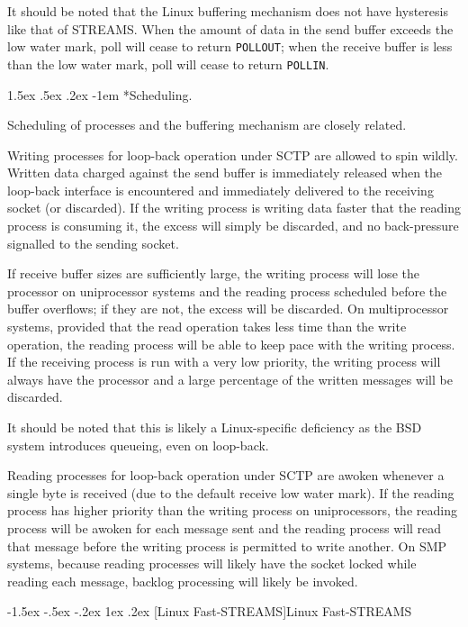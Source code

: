 \documentclass[letterpaper,final,notitlepage,twocolumn,10pt,twoside]{article}
\makeatletter
\renewcommand\subsection{\@startsection{subsection}{2}{\z@}%
                                     {-1.5ex \@plus -.5ex \@minus -.2ex}%
                                     {1ex \@plus .2ex}%
                                     {\normalfont\normalsize\bfseries}}
\renewcommand\paragraph{\@startsection{paragraph}{4}{\z@}%
                                    {1.5ex \@plus .5ex \@minus .2ex}%
                                    {-1em}%
                                    {\normalfont\normalsize\bfseries\slshape}}
\makeatother
\begin{document}
It should be noted that the Linux buffering mechanism does not have hysteresis
like that of STREAMS.  When the amount of data in the send buffer exceeds the
low water mark, poll will cease to return \texttt{POLLOUT}; when the receive
buffer is less than the low water mark, poll will cease to return
\texttt{POLLIN}.

\paragraph*{Scheduling.}

Scheduling of processes and the buffering mechanism are closely related.

Writing processes for loop-back operation under SCTP are allowed to spin
wildly.  Written data charged against the send buffer is immediately released
when the loop-back interface is encountered and immediately delivered to the
receiving socket (or discarded).  If the writing process is writing data
faster that the reading process is consuming it, the excess will simply be
discarded, and no back-pressure signalled to the sending socket.

If receive buffer sizes are sufficiently large, the writing process will lose
the processor on uniprocessor systems and the reading process scheduled before
the buffer overflows; if they are not, the excess will be discarded.  On
multiprocessor systems, provided that the read operation takes less time than
the write operation, the reading process will be able to keep pace with the
writing process.  If the receiving process is run with a very low priority,
the writing process will always have the processor and a large percentage of
the written messages will be discarded.

It should be noted that this is likely a Linux-specific deficiency as the BSD
system introduces queueing, even on loop-back.

Reading processes for loop-back operation under SCTP are awoken whenever a
single byte is received (due to the default receive low water mark).  If the
reading process has higher priority than the writing process on uniprocessors,
the reading process will be awoken for each message sent and the reading
process will read that message before the writing process is permitted to
write another.  On SMP systems, because reading processes will likely have the
socket locked while reading each message, backlog processing will likely be
invoked.

\subsection[Linux Fast-STREAMS]{Linux Fast-STREAMS}
\end{document}

